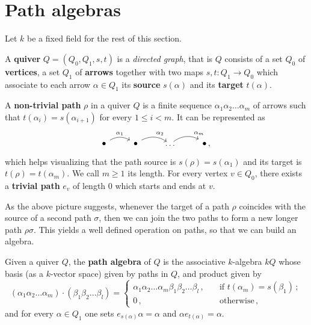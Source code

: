 
\section{Path algebras}

Let $k$ be a fixed field for the rest of this section.

\begin{df}
	A \textbf{quiver} $Q = (Q_{0},Q_{1},s,t)$ is a \emph{directed graph},
	that is $Q$ consists of a set $Q_{0}$ of \textbf{vertices},
	a set $Q_{1}$ of \textbf{arrows} together with two maps $s,t:Q_{1} \to Q_{0}$
	which associate to each arrow $\alpha \in Q_{1}$ its \textbf{source} $s(\alpha)$
	and its \textbf{target} $t(\alpha)$.
\end{df}

\begin{df}
	A \textbf{non-trivial path} $\rho$ in a quiver $Q$ is a finite sequence 
	$\alpha_{1}\alpha_{2} \dots \alpha_{m}$ of arrows such that
	$t(\alpha_{i}) = s(\alpha_{i+1})$ for every $1 \le i < m$.
	It can be represented as
	\begin{equation*}
		\begin{tikzcd}
			\bullet \ar[r, bend left, "\alpha_{1}"]
			& \bullet \ar[r, bend left, "\alpha_{2}"]
			& \dots \ar[r, bend left, "\alpha_{m}", near end]
			& \bullet\,,
		\end{tikzcd}
	\end{equation*}
	which helps visualizing that the path source is
	$s(\rho) = s(\alpha_{1})$ and its target is $t(\rho)=t(\alpha_{m})$. 
	We call $m \ge 1$ its length. For every vertex $v \in Q_{0}$,
	there exists a \textbf{trivial path} $e_{v}$ of length $0$
	which starts and ends at $v$.
\end{df}

As the above picture suggests,
whenever the target of a path $\rho$
coincides with the source of a second path $\sigma$,
then we can join the two paths to form
a new longer path $\rho\sigma$.
This yields a well defined operation
on paths, so that we can build an algebra.

\begin{df}
	Given a quiver $Q$, the \textbf{path algebra} of $Q$ 
	is the associative $k$-algebra $kQ$ whose basis (as a $k$-vector space)
	given by paths in $Q$, and product given by
	\begin{equation*}
		(\alpha_{1}\alpha_{2} \dots \alpha_{m}) \cdot (\beta_{1}\beta_{2} \dots \beta_{l}) = 
		\begin{cases}
			\alpha_{1}\alpha_{2} \dots \alpha_{m}\beta_{1}\beta_{2} \dots \beta_{l}\,,
			\quad &\text{if } t(\alpha_{m}) = s(\beta_{1})\,;\\
			0\,, \quad &\text{otherwise}\,,
		\end{cases}
	\end{equation*}
	and for every $\alpha \in Q_{1}$ one sets
	$e_{s(\alpha)}\alpha=\alpha$ and $\alpha e_{t(\alpha)} = \alpha$.
\end{df}

